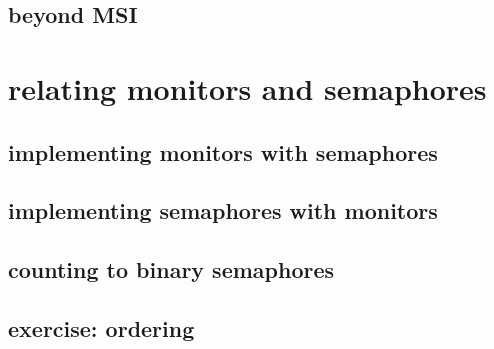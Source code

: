 \subsection{beyond MSI}


\section{relating monitors and semaphores}

\subsection{implementing monitors with semaphores}

 

\subsection{implementing semaphores with monitors}




\subsection{counting to binary semaphores}


\subsection{exercise: ordering}



